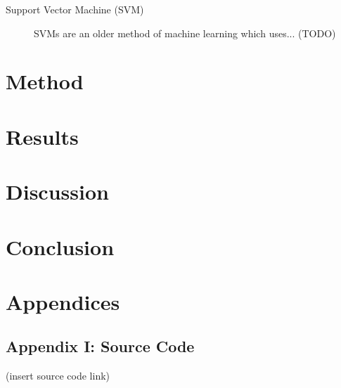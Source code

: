 \documentclass[]{report}
\begin{document}
\begin{description}
\item[Support Vector Machine (SVM)] SVMs are an older method of machine learning which uses... (TODO)
\end{description}

\section{Method}

\section{Results}

\section{Discussion}

\section{Conclusion}

\section{Appendices}

\subsection{Appendix I: Source Code}

(insert source code link)
\end{document}
